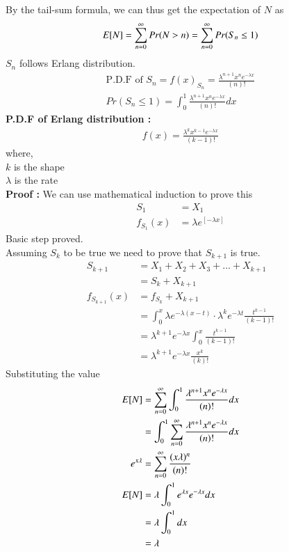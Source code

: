 \documentclass[journal,12pt,twocolumn]{IEEEtran}
\theoremstyle{definition}
\begin{document}
By the tail-sum formula, we can thus get the expectation of $N$ as\\
\begin{align}
    E[ N ] = \sum ^\infty _{n = 0} Pr(N > n) = \sum ^\infty _{n = 0} Pr(S_n \leq 1)
\end{align}
$S_n$ follows Erlang distribution.\\
\begin{align}
    \text{P.D.F of }S_n = f(x)_{S_n} = \frac{\lambda^{n+1} x^{n}e^{-\lambda x}}{(n)!}\\
    Pr(S_n \leq 1) = \int _0 ^1 \frac{\lambda^{n+1} x^{n}e^{-\lambda x}}{(n)!} dx
\end{align}
\textbf{P.D.F of Erlang distribution : }\\
\begin{align}
    f(x) = \frac{\lambda^{k} x^{k-1}e^{-\lambda x}}{(k-1)!}
\end{align}
where,\\
$k$ is the shape\\
$\lambda$ is the rate\\
\textbf{Proof : }We can use mathematical induction to prove this\\
\begin{align}
  S_1 &= X_1\\
  f_{S_1}(x) &= \lambda e^{[-\lambda x]}
\end{align}
Basic step proved.\\
Assuming $S_k$ to be true we need to prove that $S_{k+1}$ is true.\\
\begin{align}
    S_{k+1} &= X_1 + X_2 + X_3 + \dots + X_{k+1}\\
    &= S_k + X_{k+1}\\
    f_{S_{k+1}}(x) &= f_{S_k} + X_{k+1}\\
    &= \int _0 ^x \lambda e^{-\lambda(x-t)} \cdot \lambda^k e^{-\lambda t} \frac{t^{k-1}}{(k-1)!}\\
    &= \lambda^{k+1} e^{-\lambda x} \int _0 ^x \frac{t^{k-1}}{(k-1)!}\\
    &= \lambda^{k+1} e^{-\lambda x} \frac{x^k}{(k)!}
\end{align}
Substituting the value\\
\begin{align}
    E[ N ] &= \sum _{n = 0} ^\infty \int _0 ^1  \frac{\lambda^{n+1} x^{n}e^{-\lambda x}}{(n)!} dx\\
    &= \int _0 ^1 \sum _{n = 0} ^\infty \frac{\lambda^{n+1} x^{n}e^{-\lambda x}}{(n)!} dx\\
    e^{x\lambda} &= \sum _{n = 0} ^ \infty\frac{(x\lambda)^n}{(n)!}\\
    E[ N ] &=\lambda  \int _0 ^1 e^{\lambda x} e^{-\lambda x} dx\\
    &= \lambda \int _0 ^1 dx\\
    &= \lambda
\end{align}
\end{document}
